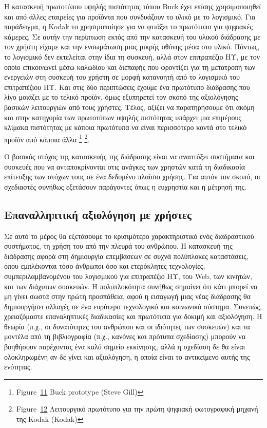 \documentclass[
]{article}
\begin{document}
Η κατασκευή πρωτοτύπου υψηλής πιστότητας τύπου Buck έχει επίσης
χρησιμοποιηθεί και από άλλες εταιρείες για προϊόντα που συνδυάζουν το
υλικό με το λογισμικό. Για παράδειγμα, η Kodak το χρησιμοποίησε για να
φτιάξει το πρωτότυπο για ψηφιακές κάμερες. Σε αυτήν την περίπτωση εκτός
από την κατασκευή του υλικού διάδρασης με τον χρήστη είχαμε και την
ενσωμάτωση μιας μικρής οθόνης μέσα στο υλικό. Πάντως, το λογισμικό δεν
εκτελείται στην ίδια τη συσκευή, αλλά στον επιτραπέζιο ΗΥ, με τον οποίο
επικοινωνεί μέσω καλωδίου και διεπαφής που φροντίζει για τη μετατροπή
των ενεργειών στη συσκευή του χρήστη σε μορφή κατανοητή από το λογισμικό
του επιτραπέζιου ΗΥ. Και στις δύο περιπτώσεις έχουμε ένα πρωτότυπο
διάδρασης που λίγο μοιάζει με το τελικό προϊόν, όμως εξυπηρετεί τον
σκοπό της αξιολόγησης βασικών λειτουργιών από τους χρήστες. Τέλος,
αξίζει να παρατηρήσουμε ότι ακόμη και στην κατηγορία των πρωτοτύπων
υψηλής πιστότητας υπάρχει μια επιμέρους κλίμακα πιστότητας με κάποια
πρωτότυπα να είναι περισσότερο κοντά στο τελικό προϊόν από κάποια άλλα
\footnote{Figure~\protect\hyperlink{fig:buck}{11} Buck prototype (Steve
  Gill)} \footnote{Figure~\protect\hyperlink{fig:kodak-hifi}{12}
  Λειτουργικό πρωτότυπο για την πρώτη ψηφιακή φωτογραφική μηχανή της
  Kodak (Kodak)}.

Ο βασικός στόχος της κατασκευής της διάδρασης είναι να αναπτύξει
συστήματα και συσκευές που να ανταποκρίνονται στις ανάγκες των χρηστών
κατά τη διαδικασία επίτευξης των στόχων τους σε ένα δεδομένο πλαίσιο
χρήσης. Για αυτόν τον σκοπό, οι σχεδιαστές συνήθως εξετάσουν παράγοντες
όπως η ευχρηστία και η μέτρησή της.

\hypertarget{ux3b5ux3c0ux3b1ux3bdux3b1ux3bbux3bbux3b7ux3c0ux3c4ux3b9ux3baux3ae-ux3b1ux3beux3b9ux3bfux3bbux3ccux3b3ux3b7ux3c3ux3b7-ux3bcux3b5-ux3c7ux3c1ux3aeux3c3ux3c4ux3b5ux3c2}{%
\subsection{Επαναλληπτική αξιολόγηση με
χρήστες}\label{ux3b5ux3c0ux3b1ux3bdux3b1ux3bbux3bbux3b7ux3c0ux3c4ux3b9ux3baux3ae-ux3b1ux3beux3b9ux3bfux3bbux3ccux3b3ux3b7ux3c3ux3b7-ux3bcux3b5-ux3c7ux3c1ux3aeux3c3ux3c4ux3b5ux3c2}}

Σε αυτό το μέρος θα εξετάσουμε το κρισιμότερο χαρακτηριστικό ενός
διαδραστικού συστήματος, τη χρήση του από την πλευρά του ανθρώπου. Η
κατασκευή της διάδρασης αφορά στη δημιουργία επεμβάσεων σε συχνά
πολύπλοκες καταστάσεις, όπου εμπλέκονται τόσο άνθρωποι όσο και
ετερόκλητες τεχνολογίες, συμπεριλαμβανομένου του λογισμικού για
επιτραπέζιο ΗΥ, του Web, των κινητών, και των διάχυτων συσκευών. Η
πολυπλοκότητα συνήθως σημαίνει ότι κάτι μπορεί να μη γίνει σωστά στην
πρώτη προσπάθεια, αφού η εισαγωγή μιας νέας διάδρασης θα δημιουργήσει
αλλαγές σε ένα ευρύτερο τεχνολογικό και κοινωνικό σύστημα. Συνεπώς,
χρειαζόμαστε επαναληπτικές διαδικασίες και πρωτότυπα για δοκιμή και
αξιολόγηση. Η θεωρία (π.χ., οι δυνατότητες του ανθρώπου και οι ιδιότητες
των συσκευών) και τα μοντέλα από τη βιβλιογραφία (π.χ., κανόνες και
πρότυπα σχεδίασης) μπορούν να βοηθήσουν παρέχοντας ένα καλό σημείο
εκκίνησης, αλλά η σχεδίαση δε θα είναι ολοκληρωμένη αν δε γίνει και
αξιολόγηση, η οποία είναι το αντικείμενο αυτής της ενότητας.
\end{document}
